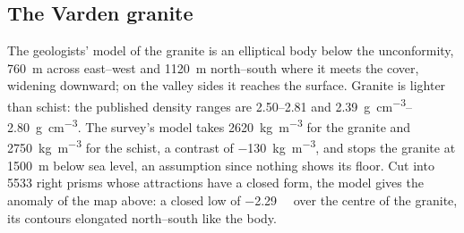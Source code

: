 \begin{omfigure}
\par{}\label{fig:b3:field-lab-methods-3:survey}
\end{omfigure}

\subsection{The Varden granite}

The geologists' model of the granite is an elliptical body below the
unconformity, \qty{760}{m} across east--west and \qty{1120}{m}
north--south where it meets the cover, widening downward; on the
valley sides it reaches the surface. Granite is lighter than schist:
the published density ranges are \numrange{2.50}{2.81} and
\qtyrange{2.39}{2.80}{g.cm^{-3}}. The survey's model takes
\qty{2620}{kg.m^{-3}} for the granite and \qty{2750}{kg.m^{-3}} for the
schist, a contrast of \qty{-130}{kg.m^{-3}}, and stops the granite at
\qty{1500}{m} below sea level, an assumption since nothing shows its
floor. Cut into \num{5533} right prisms whose attractions have a closed
form, the model gives the anomaly of the map above: a closed low of
\qty{-2.29}{\milli\gal} over the centre of the granite, its contours
elongated north--south like the body.


